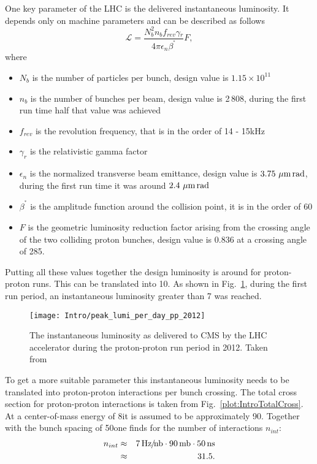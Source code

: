 One key parameter of the LHC is the delivered instantaneous luminosity. It depends only on machine parameters and can be described as follows
\begin{equation}
\mathcal{L} = \frac{N_{b}^{2}n_{b}f_{rev}\gamma{}_{r}}{4\pi\epsilon{}_{n}\beta^{^\ast}}F,
\label{eq:Luminosity}
\end{equation}
where
\begin{itemize}
\item{$N_{b}$} is the number of particles per bunch, design value is $1.15 \times 10^{11}$
\item{$n_{b}$} is the number of bunches per beam, design value is 2\,808, during the first run time half that value was achieved
\item{$f_{rev}$} is the revolution frequency, that is in the order of 14 - 15\unit{kHz}
\item{$\gamma_{r}$} is the relativistic gamma factor
\item{$\epsilon{}_{n}$} is the normalized transverse beam emittance, design value is $3.75\,\,\mu\text{m}{}\,\text{rad}$, during the first run time it was around $2.4\,\,\mu\text{m}{}\,\text{rad}$
\item{$\beta^{^\ast}$} is the amplitude function around the collision point, it is in the order of 60\cm{}
\item{$F$} is the geometric luminosity reduction factor arising from the crossing angle of the two colliding proton bunches, design value is 0.836 at a crossing angle of 285\murad{}.
\end{itemize}

Putting all these values together the design luminosity is around \LHigh{} for proton-proton runs. This can be translated into 10\hertzpernbarn{}. As shown in Fig.~\ref{plot:IntroInstLumi}, during the first run period, an instantaneous luminosity greater than 7\hertzpernbarn{} was reached.

\begin{figure}[Htb]
  \centering
  \texttt{[image: Intro/peak\_lumi\_per\_day\_pp\_2012]}
  \caption[Instantaneous luminosity at CMS]{The instantaneous luminosity as delivered to CMS by the LHC accelerator during the proton-proton run period in 2012. Taken from~\cite{CMS-Lumi-Public-Webpage} \label{plot:IntroInstLumi}}
\end{figure}

To get  a more suitable parameter this instantaneous luminosity needs to be translated into proton-proton interactions per bunch crossing. The total cross section for proton-proton interactions is taken from Fig.~\ref{plot:IntroTotalCross}. At a center-of-mass energy of 8\TeV it is assumed to be approximately 90\mb. Together with the bunch spacing of 50\ns one finds for the number of interactions $n_{int}$:
\begin{eqnarray}
n_{int} & \approx & 7\, \text{Hz\hspace{-0.08em}/\hspace{-0.16em}}\text{nb} \cdot 90\,\text{mb} \cdot 50\,\text{ns} \nonumber \\
 & \approx & 31.5 \nonumber.
\end{eqnarray}

